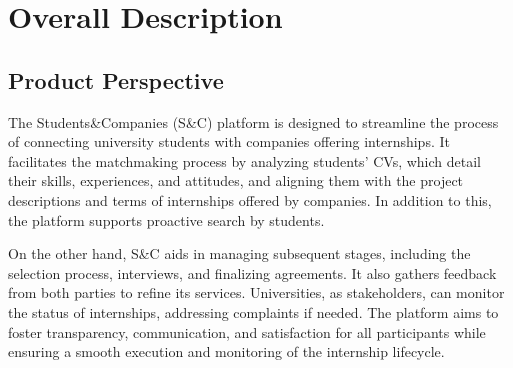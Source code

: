 \documentclass{article}
\begin{document}
\section{Overall Description}
\subsection{Product Perspective}
The Students\&Companies (S\&C) platform is designed to streamline the process of connecting university students with companies offering internships. It facilitates the matchmaking process by analyzing students’ CVs, which detail their skills, experiences, and attitudes, and aligning them with the project descriptions and terms of internships offered by companies. In addition to this, the platform supports proactive search by students.

On the other hand, S\&C aids in managing subsequent stages, including the selection process, interviews, and finalizing agreements. It also gathers feedback from both parties to refine its services. 
Universities, as stakeholders, can monitor the status of internships, addressing complaints if needed. The platform aims to foster transparency, communication, and satisfaction for all participants while ensuring a smooth execution and monitoring of the internship lifecycle.
\end{document}
